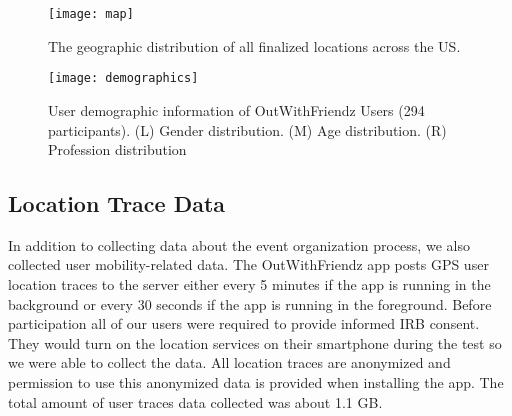 \begin{figure}
\centering
\texttt{[image: map]}
\caption{The geographic distribution of all finalized locations across the US.}
\label{fig:map}
\end{figure}

\begin{comment}
Further analysis of our user demographics would be interesting. For instance,  
an earlier study reported that many housewives are using
the crowdsourcing market to earn extra money~\cite{gray2016crowd}.
This may also be reflected in our survey results, as housewives may be more
suited for this study because they have more free time to spend with friends.
This may due to the fact that mobile device usage is widespread among young people.
\end{comment} 

\begin{figure}
\centering
\texttt{[image: demographics]}

\caption{User demographic information of OutWithFriendz Users (294 participants). (L) Gender distribution. (M) Age distribution. (R) Profession distribution}
\label{fig:demographic}
\end{figure}

\subsection{Location Trace Data}
\label{sec:trace}
In addition to collecting data about the event organization process, we also collected user mobility-related data.  The OutWithFriendz app posts GPS user location traces to the server
either every 5 minutes if the app is running in the background or every 30 seconds if the app is running
in the foreground. Before participation all of our users were required to provide informed IRB consent. They would  
turn on the location services on their smartphone during the test so we were able to collect the data.  
All location traces are anonymized and permission to use this anonymized data is provided when installing the 
app. The total amount of user traces data collected was about 1.1 GB. 

